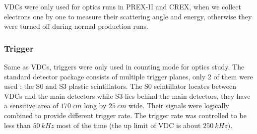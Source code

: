 VDCs were only used for optics runs in PREX-II and CREX, when we collect electrons
one by one to measure their scattering angle and energy, otherwise they were
turned off during normal production runs.



\subsubsection{Trigger}
Same as VDCs, triggers were only used in counting mode for optics study. The standard
detector package consists of multiple trigger planes, only 2 of them were used :
the S0 and S3 plastic scintillators. The S0 scintillator locates between VDCs and the main
detectors while S3 lies behind the main detectors, they have a sensitive area
of $170\ cm$ long by $25\ cm$ wide. Their signals were logically combined to 
provide different trigger rate. The trigger rate was controlled to be less
than $50\ kHz$ most of the time (the up limit of VDC is about $250\ kHz$).
